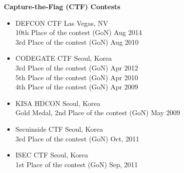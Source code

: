 \documentclass[11pt]{article}
\newenvironment{innerlist}[1][\enskip\textbullet]%
        {\begin{itemize}[#1,leftmargin=*,parsep=0pt,itemsep=0pt,topsep=0pt,partopsep=0pt]}
        {\end{itemize}}
\newcommand{\halfblankline}{\quad\vspace{-0.5\baselineskip}\pagebreak[3]}
\begin{document}
\textbf{Capture-the-Flag (CTF) Contests}
\begin{innerlist}
\item DEFCON CTF \hfill Las Vegas, NV\\
10th Place of the contest (GoN) \hfill Aug 2014\\
3rd Place of the contest (GoN) \hfill Aug 2010
\item CODEGATE CTF \hfill Seoul, Korea\\
3rd Place of the contest (GoN) \hfill Apr 2012\\
5th Place of the contest (GoN) \hfill Apr 2010\\
4th Place of the contest (GoN) \hfill Apr 2009
\item KISA HDCON \hfill Seoul, Korea\\
Gold Medal, 2nd Place of the contest (GoN) \hfill May 2009
\item Secuinside CTF \hfill Seoul, Korea\\
3rd Place of the contest (GoN) \hfill Oct, 2011
\item ISEC CTF \hfill Seoul, Korea\\
1st Place of the contest (GoN) \hfill Sep, 2011
\end{innerlist}


\end{document}

